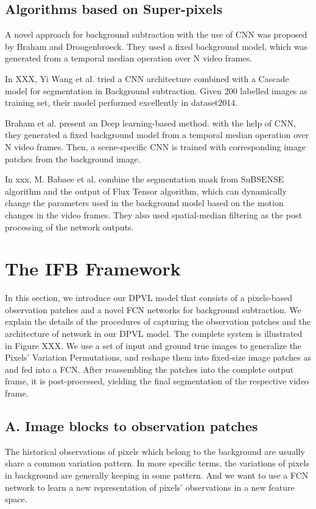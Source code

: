 \documentclass[journal]{IEEEtran}
\begin{document}
\subsection{Algorithms based on Super-pixels}
\label{sec_sup}
A novel approach for background subtraction with the use of CNN was proposed by Braham and Droogenbroeck.
They used a fixed background model, which was generated from a temporal median operation over N video frames.

In XXX, Yi Wang et al.
tried a CNN architecture combined with a Cascade model for segmentation in Background subtraction.
Given 200 labelled images as training set, their model performed excellently in dataset2014.

Braham et al.
present an Deep learning-based method.
with the help of CNN, they generated a fixed background model from a temporal median operation over N video frames.
Then, a scene-specific CNN is trained with corresponding image patches from the background image.

In xxx, M.
Babaee et al.
combine the segmentation mask from SuBSENSE algorithm and the output of Flux Tensor algorithm, which can dynamically change the parameters used in the background model based on the motion changes in the video frames.
They also used spatial-median filtering as the post processing of the network outputs.


\section{The IFB Framework}
\label{sec3}
In this section, we introduce our DPVL model that consists of a pixels-based observation patches and a novel FCN networks for background subtraction.
We explain the details of the procedures of capturing the observation patches and the architecture of network in our DPVL model.
The complete system is illustrated in Figure XXX.
We use a set of input and ground true images to generalize the Pixels’ Variation Permutations, and reshape them into fixed-size image patches as and fed into a FCN.
After reassembling the patches into the complete output frame, it is post-processed, yielding the final segmentation of the respective video frame.

\subsection{A. Image blocks to observation  patches}
\label{sec3_fc}
The historical observations of pixels which belong to the background are usually share a common variation pattern.
In more specific terms, the variations of pixels in background are generally keeping in some pattern.
And we want to use a FCN network to learn a new representation of pixels’ observations in a new feature space.
  
\end{document}

